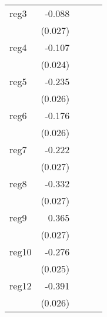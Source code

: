 {\begin{longtable}{l*{4}{D{.}{.}{-1}}}
\addlinespace
reg3        &      -0.088\sym{***}&                     &                     &                     \\
            &     (0.027)         &                     &                     &                     \\
\addlinespace
reg4        &      -0.107\sym{***}&                     &                     &                     \\
            &     (0.024)         &                     &                     &                     \\
\addlinespace
reg5        &      -0.235\sym{***}&                     &                     &                     \\
            &     (0.026)         &                     &                     &                     \\
\addlinespace
reg6        &      -0.176\sym{***}&                     &                     &                     \\
            &     (0.026)         &                     &                     &                     \\
\addlinespace
reg7        &      -0.222\sym{***}&                     &                     &                     \\
            &     (0.027)         &                     &                     &                     \\
\addlinespace
reg8        &      -0.332\sym{***}&                     &                     &                     \\
            &     (0.027)         &                     &                     &                     \\
\addlinespace
reg9        &       0.365\sym{***}&                     &                     &                     \\
            &     (0.027)         &                     &                     &                     \\
\addlinespace
reg10       &      -0.276\sym{***}&                     &                     &                     \\
            &     (0.025)         &                     &                     &                     \\
\addlinespace
reg12       &      -0.391\sym{***}&                     &                     &                     \\
            &     (0.026)         &                     &                     &                     \\

\end{longtable}}
